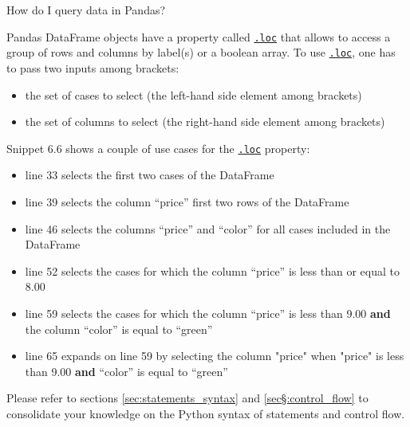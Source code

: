 \documentclass[a4paper,11pt]{book}
\numberwithin{figure}{chapter}
\numberwithin{table}{chapter}
\newcommand{\question}[1]{%
    \begin{tcolorbox}[colback=comp_c!10,colframe=comp_c,sidebyside align=top,width=\linewidth,before skip=1ex]
        #1
    \end{tcolorbox}
    \switchcolumn%
}
\newcommand{\note}[1]{%
    \begin{tcolorbox}[colback=white!0,colframe=white!10,width=\linewidth,before skip=1ex]
        #1
    \end{tcolorbox}
}
\begin{document}
\begin{paracol}{2}
	\question{\raggedright How do I query data in Pandas?}
	\note{Pandas DataFrame objects have a property called \href{https://pandas.pydata.org/docs/reference/api/pandas.DataFrame.loc.html?highlight=loc#pandas.DataFrame.loc}{\texttt{.loc}} that allows to access a group of rows and columns by label(s) or a boolean array. To use \href{https://pandas.pydata.org/docs/reference/api/pandas.DataFrame.loc.html?highlight=loc#pandas.DataFrame.loc}{\texttt{.loc}}, one has to pass two inputs among brackets:
	
	\begin{itemize}
		\item the set of cases to select (the left-hand side element among brackets)
		\item the set of columns to select (the right-hand side element among brackets)
	\end{itemize}

	\quad Snippet 6.6 shows a couple of use cases for the \href{https://pandas.pydata.org/docs/reference/api/pandas.DataFrame.loc.html?highlight=loc#pandas.DataFrame.loc}{\texttt{.loc}} property:

	\begin{itemize}
		\item line 33 selects the first two cases of the DataFrame
		\item line 39 selects the column ``price'' first two rows of the DataFrame
		\item line 46 selects  the columns ``price'' and ``color'' for all cases included in the DataFrame
		\item line 52 selects the cases for which the column ``price'' is less than or equal to 8.00
		\item line 59 selects the cases for which the column ``price'' is less than 9.00 \textbf{and} the column ``color'' is equal to ``green''
		\item line 65 expands on line 59 by selecting the column "price" when "price" is less than 9.00 \textbf{and} ``color'' is equal to ``green''
	\end{itemize}

	\quad Please refer to sections \ref{sec:statements_syntax} and \ref{sec§:control_flow} to consolidate your knowledge on the Python syntax of statements and control flow.
	}
\end{paracol}
\clearpage
\end{document}
